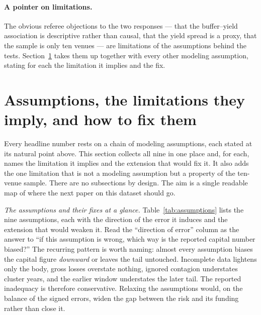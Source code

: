 \documentclass[11pt]{article}
\theoremstyle{definition}
\theoremstyle{remark}
\theoremstyle{definition}
\newcommand{\1}{\mathbf{1}}
\begin{document}
\paragraph{A pointer on limitations.}
The obvious referee objections to the two responses --- that the buffer--yield
association is descriptive rather than causal, that the yield spread is a proxy,
that the sample is only ten venues --- are limitations of the assumptions behind
the tests. Section~\ref{sec:assumptions} takes them up together with every other
modeling assumption, stating for each the limitation it implies and the fix.

\section{Assumptions, the limitations they imply, and how to fix them}\label{sec:assumptions}

Every headline number rests on a chain of modeling assumptions, each stated at
its natural point above. This section collects all nine in one place and, for
each, names the limitation it implies and the extension that would fix it. It
also adds the one limitation that is not a modeling assumption but a property of
the ten-venue sample. There are no subsections by design. The aim is a single
readable map of where the next paper on this dataset should go.

\emph{The assumptions and their fixes at a glance.}
Table~\ref{tab:assumptions} lists the nine assumptions, each with the direction
of the error it induces and the extension that would weaken it. Read the
``direction of error'' column as the answer to ``if this assumption is wrong,
which way is the reported capital number biased?'' The recurring pattern is worth
naming: almost every assumption biases the capital figure \emph{downward} or
leaves the tail untouched. Incomplete data lightens only the body, gross losses
overstate nothing, ignored contagion understates cluster years, and the earlier
window understates the later tail. The reported inadequacy is therefore
conservative. Relaxing the assumptions would, on the balance of the signed
errors, widen the gap between the risk and its funding rather than close it.
\end{document}
